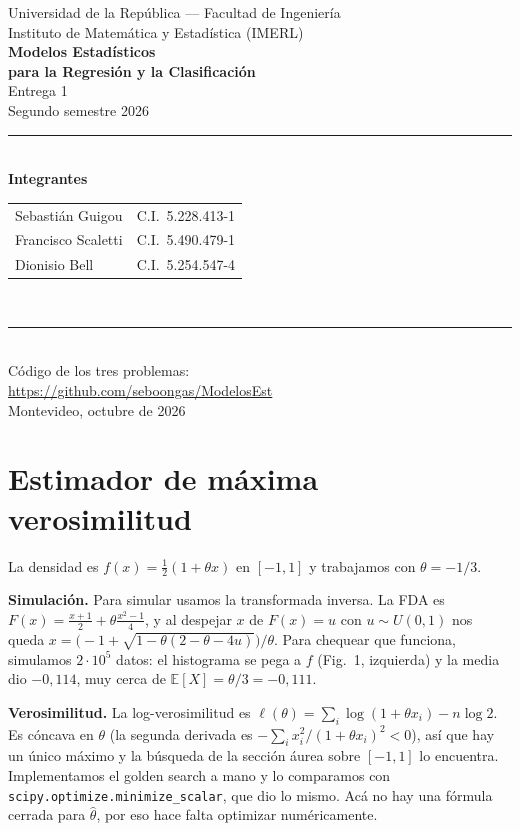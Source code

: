 \documentclass[10pt,a4paper]{article}
\newcommand{\E}{\mathbb{E}}
\begin{document}
\begin{titlepage}
\centering
\vspace*{2.5cm}
{\large Universidad de la República --- Facultad de Ingeniería}\\[0.4cm]
{\large Instituto de Matemática y Estadística (IMERL)}\\[2.2cm]
{\Huge\bfseries Modelos Estadísticos\\[4pt] para la Regresión y la Clasificación}\\[0.8cm]
{\Large Entrega 1}\\[0.3cm]
{\large Segundo semestre 2026}\\[2.5cm]
\rule{0.6\textwidth}{0.4pt}\\[0.8cm]
{\large\textbf{Integrantes}}\\[0.5cm]
\begin{tabular}{ll}
Sebastián Guigou     & C.I.\ 5.228.413-1 \\[6pt]
Francisco Scaletti   & C.I.\ 5.490.479-1 \\[6pt]
Dionisio Bell        & C.I.\ 5.254.547-4 \\
\end{tabular}\\[0.8cm]
\rule{0.6\textwidth}{0.4pt}\\[1.2cm]
{\large Código de los tres problemas:}\\[0.2cm]
\url{https://github.com/seboongas/ModelosEst}\\[2cm]
{\large Montevideo, octubre de 2026}
\end{titlepage}

\section{Estimador de máxima verosimilitud}
La densidad es $f(x)=\tfrac12(1+\theta x)$ en $[-1,1]$ y trabajamos con $\theta=-1/3$.

\textbf{Simulación.} Para simular usamos la transformada inversa. La FDA es $F(x)=\tfrac{x+1}{2}+\theta\tfrac{x^2-1}{4}$, y al despejar $x$ de $F(x)=u$ con $u\sim U(0,1)$ nos queda $x=\bigl(-1+\sqrt{1-\theta(2-\theta-4u)}\bigr)/\theta$. Para chequear que funciona, simulamos $2\cdot10^5$ datos: el histograma se pega a $f$ (Fig.~1, izquierda) y la media dio $-0{,}114$, muy cerca de $\E[X]=\theta/3=-0{,}111$.

\textbf{Verosimilitud.} La log-verosimilitud es $\ell(\theta)=\sum_i\log(1+\theta x_i)-n\log 2$. Es cóncava en $\theta$ (la segunda derivada es $-\sum_i x_i^2/(1+\theta x_i)^2<0$), así que hay un único máximo y la búsqueda de la sección áurea sobre $[-1,1]$ lo encuentra. Implementamos el golden search a mano y lo comparamos con \texttt{scipy.optimize.minimize\_scalar}, que dio lo mismo. Acá no hay una fórmula cerrada para $\hat\theta$, por eso hace falta optimizar numéricamente.
\end{document}
